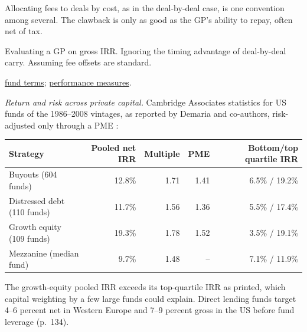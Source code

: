 \begin{qfmethod}
 Allocating fees to deals by cost, as in the deal-by-deal case, is one convention among several. The clawback is only as good as the GP's ability to repay, often net of tax.

 Evaluating a GP on gross IRR. Ignoring the timing advantage of deal-by-deal carry. Assuming fee offsets are standard.

 \hyperref[def:alternative-fund-terms]{fund terms}; \hyperref[meth:private-fund-multiples-pme]{performance measures}.

\end{qfmethod}

\begin{qfmethod}\label{meth:private-capital-allocation}
 \emph{Return and risk across private capital.} Cambridge Associates statistics for US funds of the 1986--2008 vintages, as reported by Demaria and co-authors, risk-adjusted only through a PME \citep[pp.~116--117, 123, 130, 133]{demaria-private-markets-2021}:
\begin{center}\small
\begin{tabular}{@{}lrrrr@{}}
\toprule
Strategy & Pooled net IRR & Multiple & PME & Bottom/top quartile IRR \\
\midrule
Buyouts (604 funds) & 12.8\% & 1.71 & 1.41 & 6.5\% / 19.2\% \\
Distressed debt (110 funds) & 11.7\% & 1.56 & 1.36 & 5.5\% / 17.4\% \\
Growth equity (109 funds) & 19.3\% & 1.78 & 1.52 & 3.5\% / 19.1\% \\
Mezzanine (median fund) & 9.7\% & 1.48 & -- & 7.1\% / 11.9\% \\
\bottomrule
\end{tabular}
\end{center}
The growth-equity pooled IRR exceeds its top-quartile IRR as printed, which capital weighting by a few large funds could explain. Direct lending funds target 4--6 percent net in Western Europe and 7--9 percent gross in the US before fund leverage (p.~134).


\end{qfmethod}
